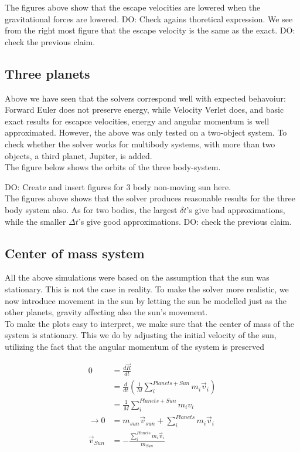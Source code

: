 \documentclass{article}
\begin{document}
The figures above show that the escape velocities are lowered when the gravitational forces are lowered. DO: Check agains thoretical expression. We see from the right most figure that the escape velocity is the same as the exact. DO: check the previous claim.

\subsection{Three planets}
Above we have seen that the solvers correspond well with expected behavoiur: Forward Euler does not preserve energy, while Velocity Verlet does, and basic exact results for escapce velocities, energy and angular momentum is well approximated. However, the above was only tested on a two-object system. To check whether the solver works for multibody systems, with more than two objects, a third planet, Jupiter, is added.\\

The figure below shows the orbits of the three body-system.

DO: Create and insert figures for 3 body non-moving sun here.\\

The figures above shows that the solver produces reasonable results for the three body system also. As for two bodies, the largest $\delta t$'s give bad approximations, while the smaller $\Delta t$'s give good approximations. DO: check the previous claim.\\

\subsection{Center of mass system}
All the above simulations were based on the assumption that the sun was stationary. This is not the case in reality. To make the  solver more realistic, we now introduce movement in the sun by letting the sun be modelled just as the other planets, gravity affecting also the sun's movement. \\

To make the plots easy to interpret, we make sure that the center of mass of the system is stationary. This we do by adjusting the initial velocity of the sun, utilizing the fact that the angular momentum of the system is preserved

\begin{subequations}
	\begin{align}
	0 &= \frac{d \vec R}{dt}	\\
	&= \frac{d}{dt} (\frac{1}{M} \sum_i^{Planets+Sun} m_i \vec{v}_i)\\
	&= \frac{1}{M} \sum_i^{Planets+Sun} m_i v_i \\
	\rightarrow 0 &=m_{sun} \vec{v}_{sun} + \sum_i^{Planets} m_i \vec{v}_i \\
	\vec{v}_{Sun} &= - \frac{\sum_i^{Planets} m_i \vec{v}_i}{m_{Sun}}
	\end{align}
\end{subequations}
\end{document}
